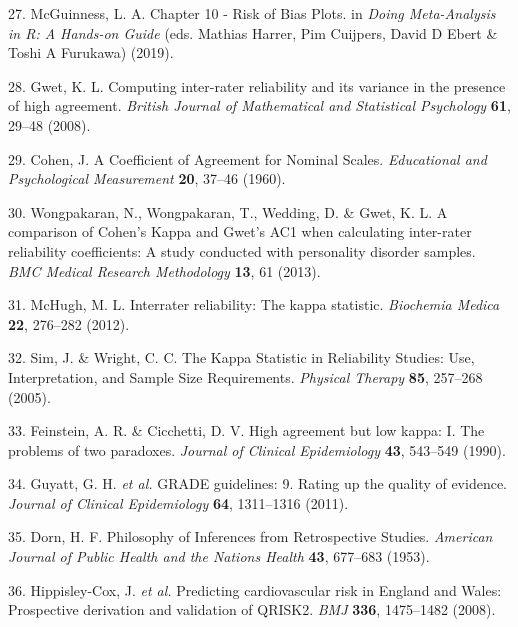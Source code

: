 \documentclass[a4paper, twoside]{templates/ociamthesis}
\begin{document}
\leavevmode\hypertarget{ref-mcguinness2019}{}%
27. McGuinness, L. A. Chapter 10 - Risk of Bias Plots. in \emph{Doing Meta-Analysis in R: A Hands-on Guide} (eds. Mathias Harrer, Pim Cuijpers, David D Ebert \& Toshi A Furukawa) (2019).

\leavevmode\hypertarget{ref-gwet2008}{}%
28. Gwet, K. L. Computing inter-rater reliability and its variance in the presence of high agreement. \emph{British Journal of Mathematical and Statistical Psychology} \textbf{61}, 29--48 (2008).

\leavevmode\hypertarget{ref-cohen1960}{}%
29. Cohen, J. A Coefficient of Agreement for Nominal Scales. \emph{Educational and Psychological Measurement} \textbf{20}, 37--46 (1960).

\leavevmode\hypertarget{ref-wongpakaran2013}{}%
30. Wongpakaran, N., Wongpakaran, T., Wedding, D. \& Gwet, K. L. A comparison of Cohen's Kappa and Gwet's AC1 when calculating inter-rater reliability coefficients: A study conducted with personality disorder samples. \emph{BMC Medical Research Methodology} \textbf{13}, 61 (2013).

\leavevmode\hypertarget{ref-mchugh2012}{}%
31. McHugh, M. L. Interrater reliability: The kappa statistic. \emph{Biochemia Medica} \textbf{22}, 276--282 (2012).

\leavevmode\hypertarget{ref-sim2005}{}%
32. Sim, J. \& Wright, C. C. The Kappa Statistic in Reliability Studies: Use, Interpretation, and Sample Size Requirements. \emph{Physical Therapy} \textbf{85}, 257--268 (2005).

\leavevmode\hypertarget{ref-feinstein1990}{}%
33. Feinstein, A. R. \& Cicchetti, D. V. High agreement but low kappa: I. The problems of two paradoxes. \emph{Journal of Clinical Epidemiology} \textbf{43}, 543--549 (1990).

\leavevmode\hypertarget{ref-guyatt2011}{}%
34. Guyatt, G. H. \emph{et al.} GRADE guidelines: 9. Rating up the quality of evidence. \emph{Journal of Clinical Epidemiology} \textbf{64}, 1311--1316 (2011).

\leavevmode\hypertarget{ref-dorn1953}{}%
35. Dorn, H. F. Philosophy of Inferences from Retrospective Studies. \emph{American Journal of Public Health and the Nations Health} \textbf{43}, 677--683 (1953).

\leavevmode\hypertarget{ref-hippisley-cox2008}{}%
36. Hippisley-Cox, J. \emph{et al.} Predicting cardiovascular risk in England and Wales: Prospective derivation and validation of QRISK2. \emph{BMJ} \textbf{336}, 1475--1482 (2008).
\end{document}
